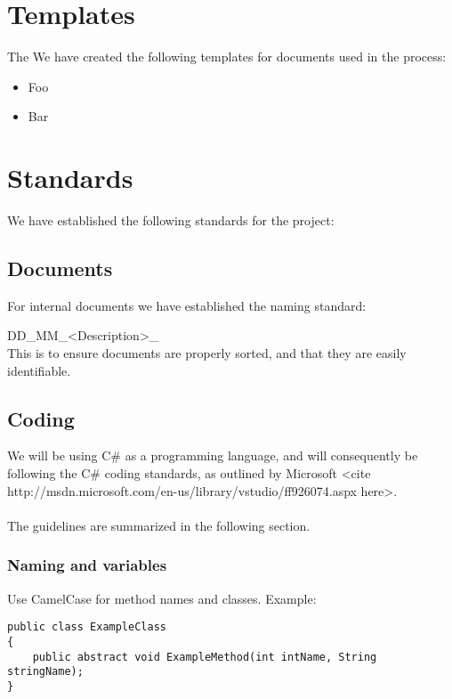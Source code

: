 \documentclass[12pt, a4paper]{article}
\begin{document}
\section{Templates}The
We have created the following templates for documents used in the process:

\begin{itemize}

\item Foo
\item Bar

\end{itemize}

\section{Standards}
We have established the following standards for the project:

\subsection{Documents}
For internal documents we have established the naming standard:

DD\_MM\_<Description>\_<Version if applicable>
\\
This is to ensure documents are properly sorted, and that they are easily identifiable.



\subsection{Coding}
We will be using C\# as a programming language, and will consequently be following the C\# coding standards, as outlined by Microsoft <cite http://msdn.microsoft.com/en-us/library/vstudio/ff926074.aspx here>.
\\\\
The guidelines are summarized in the following section.\\

\subsubsection{Naming and variables}
Use CamelCase for method names and classes.
Example:\\
\begin{lstlisting}
public class ExampleClass
{
	public abstract void ExampleMethod(int intName, String stringName);
}
\end{lstlisting}
\end{document}
